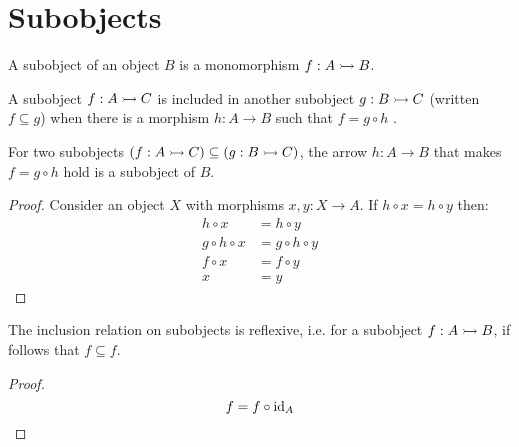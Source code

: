 \section{Subobjects}

\begin{definition}[Subobjects]
  A subobject of an object $B$ is a monomorphism $f:A\rightarrowtail B$.
  \parencite[p.~75]{goldblatt:topoi}
\end{definition}

\begin{definition}
  A subobject $f:A\rightarrowtail C$ is included in another subobject $g:B\rightarrowtail C$
  (written $f \subseteq g$) when there is a morphism $h:A\to B$ such that $f=
  g\circ h$ \parencite[p.~76]{goldblatt:topoi}.
\end{definition}

\begin{theorem}
  For two subobjects $(f:A\rightarrowtail C)\subseteq (g:B\rightarrowtail C)$, the arrow $h:A\to B$
  that makes $f= g\circ h$ hold is a subobject of $B$.

  \begin{proof}
    Consider an object $X$ with morphisms $x,y: X \to A$. If $h\circ x = h\circ
    y$ then:
    \[
      \begin{aligned}
        h\circ x &= h\circ y\\
        g\circ h\circ x &= g\circ h\circ y\\
        f\circ x&= f\circ y\\
        x&= y
      \end{aligned}
    \]
  \end{proof}
\end{theorem}

\begin{theorem}
  The inclusion relation on subobjects is reflexive, i.e. for a subobject
  $f:A\rightarrowtail B$, if follows that $f\subseteq f$.

  \begin{proof}
    \[f = f \circ \mathrm{id}_A\]
  \end{proof}
\end{theorem}

